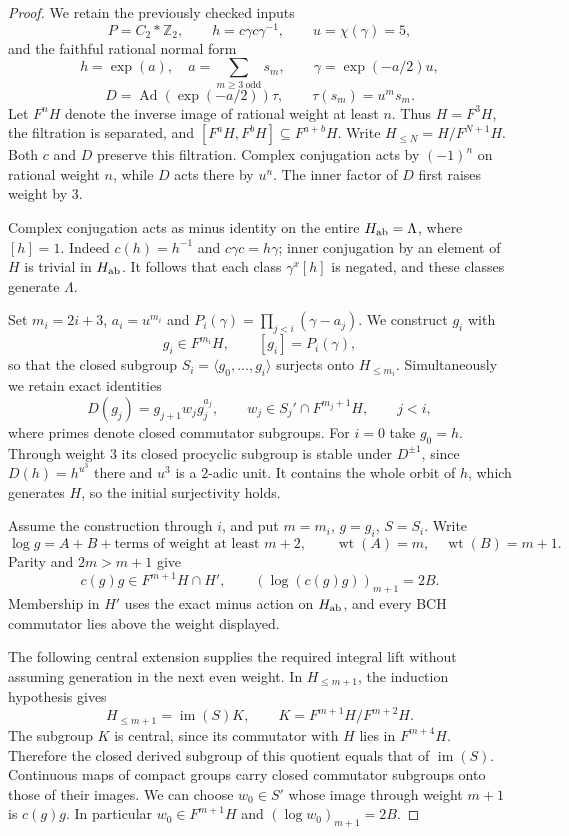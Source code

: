 \begin{proof}
We retain the previously checked inputs
\[
 P=C_2*\mathbb Z_2,\qquad
 h=c\gamma c\gamma^{-1},\qquad u=\chi(\gamma)=5,
\]
and the faithful rational normal form
\[
 h=\exp(a),\quad a=\sum_{m\geq3\ {\mathrm{odd}}}s_m,
 \qquad\gamma=\exp(-a/2)u,
\]
\[
 D=\operatorname{Ad}(\exp(-a/2))\tau,
 \qquad\tau(s_m)=u^m s_m.
\]
Let $F^nH$ denote the inverse image of rational weight at
least $n$. Thus $H=F^3H$, the filtration is separated, and
$[F^aH,F^bH]\subseteq F^{a+b}H$. Write
$H_{\leq N}=H/F^{N+1}H$. Both $c$ and $D$ preserve this
filtration. Complex conjugation acts by $(-1)^n$ on rational
weight $n$, while $D$ acts there by $u^n$. The inner factor
of $D$ first raises weight by $3$.

Complex conjugation acts as minus identity on the entire
$H_{\rm ab}=\Lambda$, where $[h]=1$.
Indeed $c(h)=h^{-1}$ and $c\gamma c=h\gamma$; inner
conjugation by an element of $H$ is trivial in $H_{\rm ab}$.
It follows that each class $\gamma^x[h]$ is negated, and
these classes generate $\Lambda$.

Set $m_i=2i+3$, $a_i=u^{m_i}$ and
$P_i(\gamma)=\prod_{j<i}(\gamma-a_j)$.
We construct $g_i$ with
\[
 g_i\in F^{m_i}H,\qquad [g_i]=P_i(\gamma),            \tag{A3}
\]
so that the closed subgroup
$S_i=\langle g_0,\ldots,g_i\rangle$ surjects onto
$H_{\leq m_i}$. Simultaneously we retain exact identities
\[
 D(g_j)=g_{j+1}w_jg_j^{a_j},\qquad
 w_j\in S_j'\cap F^{m_j+1}H,\qquad j<i,             \tag{A4}
\]
where primes denote closed commutator subgroups.
For $i=0$ take $g_0=h$. Through weight $3$ its closed
procyclic subgroup is stable under $D^{\pm1}$, since
$D(h)=h^{u^3}$ there and $u^3$ is a $2$-adic unit.
It contains the whole orbit of $h$, which generates $H$,
so the initial surjectivity holds.

Assume the construction through $i$, and put $m=m_i$,
$g=g_i$, $S=S_i$. Write
\[
 \log g=A+B+\text{terms of weight at least }m+2,
       \qquad\operatorname{wt}(A)=m,\quad
              \operatorname{wt}(B)=m+1.
\]
Parity and $2m>m+1$ give
\[
 c(g)g\in F^{m+1}H\cap H',\qquad
          (\log(c(g)g))_{m+1}=2B.                   \tag{A5}
\]
Membership in $H'$ uses the exact minus action on
$H_{\rm ab}$, and every BCH commutator lies above the
weight displayed.

The following central extension supplies the required
integral lift without assuming generation in the next even
weight. In $H_{\leq m+1}$, the induction hypothesis gives
\[
 H_{\leq m+1}=\operatorname{im}(S)K,\qquad
 K=F^{m+1}H/F^{m+2}H.
\]
The subgroup $K$ is central, since its commutator with $H$
lies in $F^{m+4}H$. Therefore the closed derived subgroup
of this quotient equals that of $\operatorname{im}(S)$.
Continuous maps of compact groups carry closed commutator
subgroups onto those of their images. We can choose
$w_0\in S'$ whose image through weight $m+1$ is $c(g)g$.
In particular $w_0\in F^{m+1}H$ and
$(\log w_0)_{m+1}=2B$.


\end{proof}
